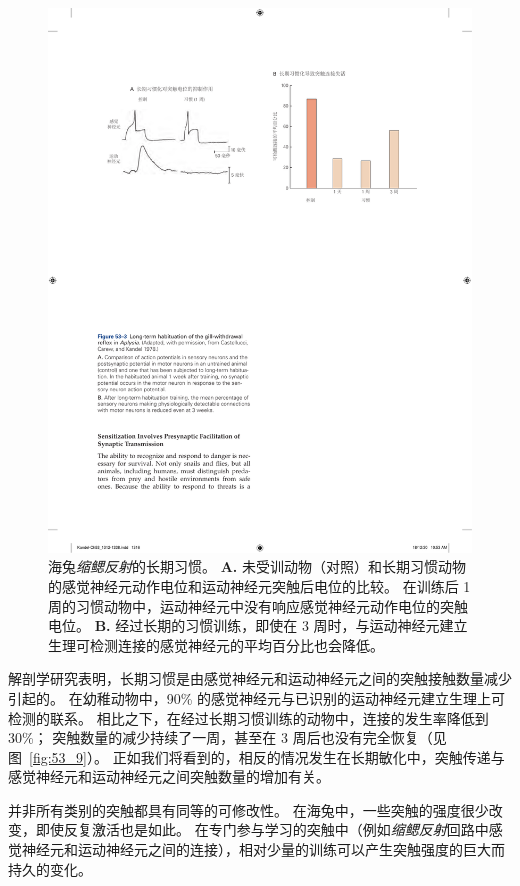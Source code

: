 \begin{figure}[htbp]
	\centering
	\includegraphics[width=0.85\linewidth]{chap53/fig_53_3}
	\caption{海兔\textit{缩鳃反射}的长期习惯\cite{castellucci1978cellular}。
		\textbf{A.} 未受训动物（对照）和长期习惯动物的感觉神经元动作电位和运动神经元突触后电位的比较。
		在训练后 1 周的习惯动物中，运动神经元中没有响应感觉神经元动作电位的突触电位。
		\textbf{B.} 经过长期的习惯训练，即使在 3 周时，与运动神经元建立生理可检测连接的感觉神经元的平均百分比也会降低。}
	\label{fig:53_3}
\end{figure}


解剖学研究表明，长期习惯是由感觉神经元和运动神经元之间的突触接触数量减少引起的。
在幼稚动物中，90\% 的感觉神经元与已识别的运动神经元建立生理上可检测的联系。
相比之下，在经过长期习惯训练的动物中，连接的发生率降低到 30\%；
突触数量的减少持续了一周，甚至在 3 周后也没有完全恢复（见图~\ref{fig:53_9}）。
正如我们将看到的，相反的情况发生在长期敏化中，突触传递与感觉神经元和运动神经元之间突触数量的增加有关。


并非所有类别的突触都具有同等的可修改性。
在海兔中，一些突触的强度很少改变，即使反复激活也是如此。
在专门参与学习的突触中（例如\textit{缩鳃反射}回路中感觉神经元和运动神经元之间的连接），相对少量的训练可以产生突触强度的巨大而持久的变化。



